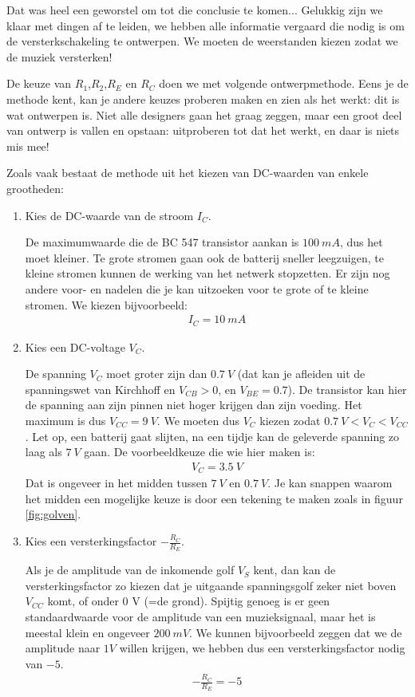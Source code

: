 \documentclass{article}
\begin{document}
				Dat was heel een geworstel om tot die conclusie te komen... Gelukkig zijn we klaar met dingen af te leiden, we hebben alle informatie vergaard die nodig is om de versterkschakeling te ontwerpen. We moeten de weerstanden kiezen zodat we de muziek versterken!

				De keuze van $R_1$,$R_2$,$R_E$ en $R_C$ doen we met volgende ontwerpmethode. Eens je de methode kent, kan je andere keuzes proberen maken en zien als het werkt: dit is wat ontwerpen is. Niet alle designers gaan het graag zeggen, maar een groot deel van ontwerp is vallen en opstaan: uitproberen tot dat het werkt, en daar is niets mis mee!

				Zoals vaak bestaat de methode uit het kiezen van DC-waarden van enkele grootheden:
				\begin{enumerate}
					\item Kies de DC-waarde van de  stroom $I_C$. 

					De maximumwaarde die de BC 547 transistor aankan is $100~mA$, dus het moet kleiner. Te grote stromen gaan ook de batterij sneller leegzuigen, te kleine stromen kunnen de werking van het netwerk stopzetten. Er zijn nog  andere voor- en nadelen die je kan uitzoeken voor te grote of te kleine stromen. We kiezen bijvoorbeeld:
					\begin{align}
					    I_C = 10~mA
					\end{align}

					\item Kies een DC-voltage $V_C$.

					 De spanning $V_C$ moet groter zijn dan $0.7~V$ (dat kan je afleiden uit de spanningswet van Kirchhoff en  $V_{CB} > 0$, en $V_{BE} = 0.7$). De transistor kan hier de spanning aan zijn pinnen niet hoger krijgen dan zijn voeding. Het maximum is dus $V_{CC} = 9~V$. We moeten dus $V_C$ kiezen zodat $0.7~V < V_C < V_{CC}$. Let op, een batterij gaat slijten, na een tijdje kan de geleverde spanning zo laag als $7~V$ gaan. De voorbeeldkeuze die wie hier maken is:
					\begin{align}
					    V_C =  3.5~V
					\end{align}
					 Dat is ongeveer in het midden tussen $7~V$ en $0.7~V$. Je kan snappen waarom het midden een mogelijke keuze is door een tekening te maken zoals in figuur \ref{fig:golven}.

					\item Kies een versterkingsfactor $- \frac{R_C}{R_E}$. 

					Als je de amplitude van de inkomende golf $V_S$ kent, dan kan de versterkingsfactor zo kiezen dat je uitgaande spanningsgolf zeker niet boven $V_{CC}$ komt, of onder $0$ V (=de grond). Spijtig genoeg is er geen standaardwaarde voor de amplitude van een muzieksignaal, maar het is meestal klein en ongeveer  $200~mV$. We kunnen bijvoorbeeld zeggen dat we de amplitude naar $1V$ willen krijgen, we hebben dus een versterkingsfactor nodig van $-5$.
					\begin{align}
					    -\frac{R_C}{R_E} = -5
					\end{align}
				\end{enumerate}
\end{document}
